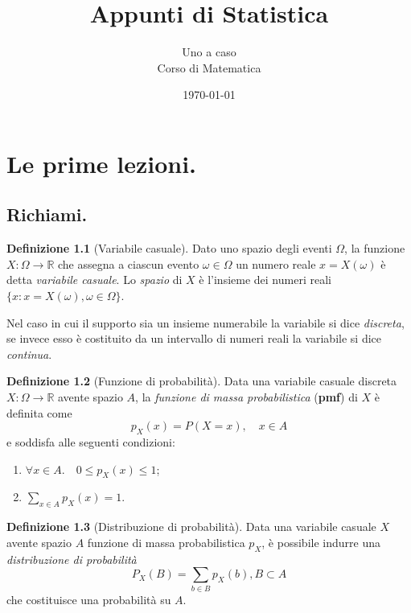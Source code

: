 \documentclass[fontsize=11pt,paper=A4,oneside,index=totoc,hyperref]{book}
\theoremstyle{definition}
\newtheorem{dfn}{Definizione}[]
\theoremstyle{plain}
\begin{document}
\title{Appunti di Statistica}

\author{
    Uno a caso \\[1cm]%
    Corso di Matematica %
}
\date{\today} %

\maketitle %

\tableofcontents %

\chapter{Le prime lezioni.}

\section{Richiami.}

\begin{dfn}[Variabile casuale]
  Dato uno spazio degli eventi \(\Omega\), la funzione \(X \colon \Omega \to \mathbb{R}\) che assegna a ciascun evento \(\omega \in \Omega\) un numero reale \(x = X(\omega)\) è detta \emph{variabile casuale}. Lo \emph{spazio} di \(X\) è l'insieme dei numeri reali \(\lbrace x \colon x = X(\omega), \omega \in \Omega\rbrace\).
\end{dfn}

Nel caso in cui il supporto sia un insieme numerabile la variabile si dice \emph{discreta}, se invece esso è costituito da un intervallo di numeri reali la variabile si dice \emph{continua}.

\begin{dfn}[Funzione di probabilità]
  Data una variabile casuale discreta \(X \colon \Omega \to \mathbb{R}\) avente spazio \(A\), la \emph{funzione di massa probabilistica} ({\bf pmf}) di \(X\) è definita come
  \[
  p_X(x) = P(X = x),\quad x \in A
  \]
  e soddisfa alle seguenti condizioni:
  \begin{enumerate}
    \item \(\forall x \in A.\quad 0 \le p_X(x) \le 1\);
    \item \(\sum_{x\in A}p_X(x) = 1\).
  \end{enumerate}
\end{dfn}

\begin{dfn}[Distribuzione di probabilità]
  Data una variabile casuale \(X\) avente spazio \(A\) funzione di massa probabilistica \(p_X\), è possibile indurre una \emph{distribuzione di probabilità}
  \begin{equation}
    P_X(B) = \sum_{b\in B}p_X(b), B \subset A
  \end{equation}
  che costituisce una probabilità su \(A\).
\end{dfn}
\end{document}
